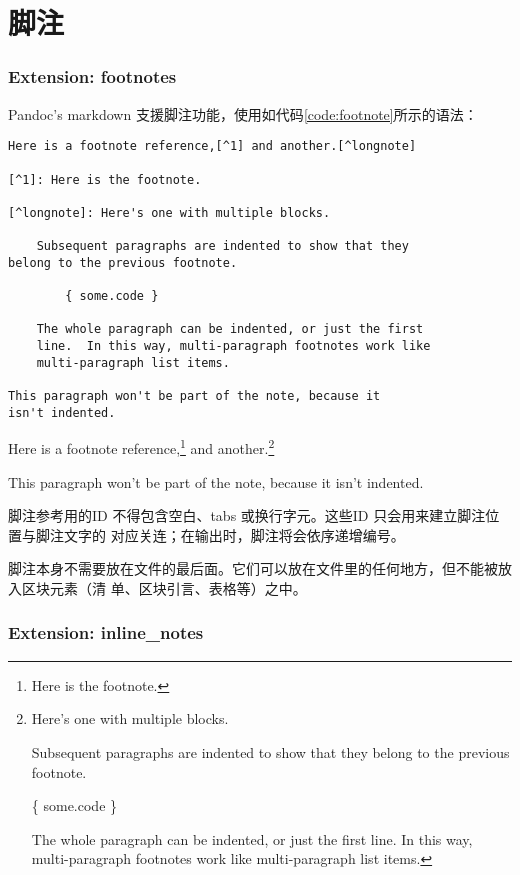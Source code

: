 \documentclass[cn]{elegantbook}
\begin{document}
\hypertarget{ux811aux6ce8}{%
\section{脚注}\label{ux811aux6ce8}}

\hypertarget{extension-footnotes}{%
\subsubsection{Extension: footnotes}\label{extension-footnotes}}

Pandoc's markdown
支援脚注功能，使用如代码\ref{code:footnote}所示的语法：

\begin{lstlisting}[caption=脚注语法, label=code:footnote, float=htbp]
Here is a footnote reference,[^1] and another.[^longnote]

[^1]: Here is the footnote.

[^longnote]: Here's one with multiple blocks.

    Subsequent paragraphs are indented to show that they
belong to the previous footnote.

        { some.code }

    The whole paragraph can be indented, or just the first
    line.  In this way, multi-paragraph footnotes work like
    multi-paragraph list items.

This paragraph won't be part of the note, because it
isn't indented.
\end{lstlisting}

Here is a footnote reference,\footnote{Here is the footnote.} and
another.\footnote{Here's one with multiple blocks.

  Subsequent paragraphs are indented to show that they belong to the
  previous footnote.

  \{ some.code \}

  The whole paragraph can be indented, or just the first line. In this
  way, multi-paragraph footnotes work like multi-paragraph list items.}

This paragraph won't be part of the note, because it isn't indented.

脚注参考用的ID 不得包含空白、tabs 或换行字元。这些ID
只会用来建立脚注位置与脚注文字的
对应关连；在输出时，脚注将会依序递增编号。

脚注本身不需要放在文件的最后面。它们可以放在文件里的任何地方，但不能被放入区块元素（清
单、区块引言、表格等）之中。

\hypertarget{extension-inline_notes}{%
\subsubsection{Extension: inline\_notes}\label{extension-inline_notes}}
\end{document}
